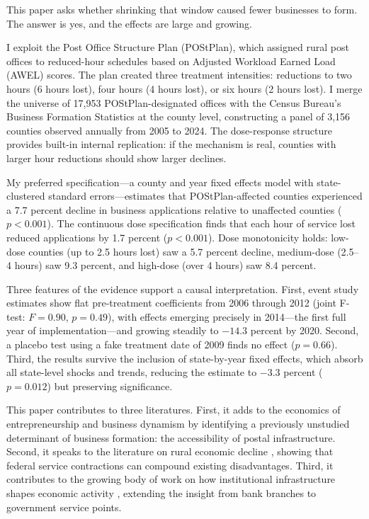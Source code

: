 \documentclass[12pt]{article}
\begin{document}
This paper asks whether shrinking that window caused fewer businesses to form. The answer is yes, and the effects are large and growing.

I exploit the Post Office Structure Plan (POStPlan), which assigned rural post offices to reduced-hour schedules based on Adjusted Workload Earned Load (AWEL) scores. The plan created three treatment intensities: reductions to two hours (6 hours lost), four hours (4 hours lost), or six hours (2 hours lost). I merge the universe of 17,953 POStPlan-designated offices with the Census Bureau's Business Formation Statistics at the county level, constructing a panel of 3,156 counties observed annually from 2005 to 2024. The dose-response structure provides built-in internal replication: if the mechanism is real, counties with larger hour reductions should show larger declines.

My preferred specification---a county and year fixed effects model with state-clustered standard errors---estimates that POStPlan-affected counties experienced a 7.7 percent decline in business applications relative to unaffected counties ($p < 0.001$). The continuous dose specification finds that each hour of service lost reduced applications by 1.7 percent ($p < 0.001$). Dose monotonicity holds: low-dose counties (up to 2.5 hours lost) saw a 5.7 percent decline, medium-dose (2.5--4 hours) saw 9.3 percent, and high-dose (over 4 hours) saw 8.4 percent.

Three features of the evidence support a causal interpretation. First, event study estimates show flat pre-treatment coefficients from 2006 through 2012 (joint F-test: $F = 0.90$, $p = 0.49$), with effects emerging precisely in 2014---the first full year of implementation---and growing steadily to $-14.3$ percent by 2020. Second, a placebo test using a fake treatment date of 2009 finds no effect ($p = 0.66$). Third, the results survive the inclusion of state-by-year fixed effects, which absorb all state-level shocks and trends, reducing the estimate to $-3.3$ percent ($p = 0.012$) but preserving significance.

This paper contributes to three literatures. First, it adds to the economics of entrepreneurship and business dynamism \citep{decker2014role, hurst2011small, adelino2017firm} by identifying a previously unstudied determinant of business formation: the accessibility of postal infrastructure. Second, it speaks to the literature on rural economic decline \citep{chetty2014measuring, autor2013rise}, showing that federal service contractions can compound existing disadvantages. Third, it contributes to the growing body of work on how institutional infrastructure shapes economic activity \citep{nguyen2019bank, glaeser2015entrepreneurship}, extending the insight from bank branches to government service points.
\end{document}
